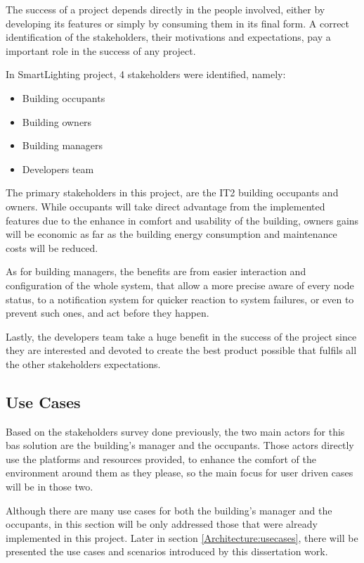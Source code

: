 The success of a project depends directly in the people involved, either by developing its features or simply by consuming them in its final form. A correct identification of the stakeholders, their motivations and expectations, pay a important role in the success of any project. 

In SmartLighting project, 4 stakeholders were identified, namely:

\begin{itemize}
	\item Building occupants
	\item Building owners
	\item Building managers
	\item Developers team
\end{itemize}


The primary stakeholders in this project, are the IT2 building occupants and owners. While occupants will take direct advantage from the implemented features due to the enhance in comfort and usability of the building, owners gains will be economic as far as the building energy consumption and maintenance costs will be reduced.

As for building managers, the benefits are from easier interaction and configuration of the whole system, that allow a more precise aware of every node status, to a notification system for quicker reaction to system failures, or even to prevent such ones, and act before they happen.

Lastly, the developers team take a huge benefit in the success of the project since they are interested and devoted to create the best product possible that fulfils all the other stakeholders expectations.


\subsection{Use Cases}
\label{Architecture:SLusecases}

Based on the stakeholders survey done previously, the two main actors for this \ac{bas} solution are the building's manager and the occupants. Those actors directly use the platforms and resources provided, to enhance the comfort of the environment around them as they please, so the main focus for user driven cases will be in those two. 

Although there are many use cases for both the building's manager and the occupants, in this section will be only addressed those that were already implemented in this project. Later in section \ref{Architecture:usecases}, there will be presented the use cases and scenarios introduced by this dissertation work.

